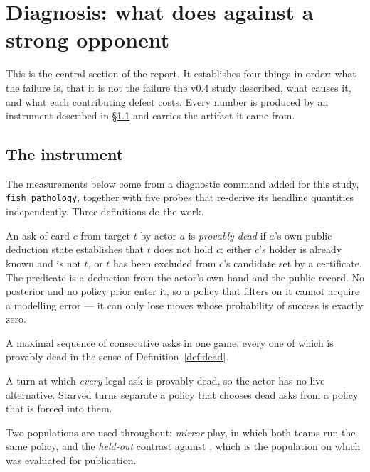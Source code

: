 \section{Diagnosis: what \vfour{} does against a strong opponent}
\label{sec:diagnosis}

This is the central section of the report. It establishes four things in order:
what the failure is, that it is not the failure the v0.4 study described, what
causes it, and what each contributing defect costs. Every number is produced by
an instrument described in \S\ref{sec:diag-instrument} and carries the artifact
it came from.

\subsection{The instrument}
\label{sec:diag-instrument}

The measurements below come from a diagnostic command added for this study,
\texttt{fish pathology}, together with five probes that re-derive its headline
quantities independently. Three definitions do the work.

\begin{definition}
\label{def:dead}
An ask of card $c$ from target $t$ by actor $a$ is \emph{provably dead} if $a$'s
own public deduction state establishes that $t$ does not hold $c$: either $c$'s
holder is already known and is not $t$, or $t$ has been excluded from $c$'s
candidate set by a certificate. The predicate is a deduction from the actor's own
hand and the public record. No posterior and no policy prior enter it, so a
policy that filters on it cannot acquire a modelling error --- it can only lose
moves whose probability of success is exactly zero.
\end{definition}

\begin{definition}
A maximal sequence of consecutive asks in one game, every one of which is
provably dead in the sense of Definition~\ref{def:dead}.
\end{definition}

\begin{definition}
A turn at which \emph{every} legal ask is provably dead, so the actor has no live
alternative. Starved turns separate a policy that chooses dead asks from a policy
that is forced into them.
\end{definition}

Two populations are used throughout: \emph{mirror} play, in which both teams run
the same policy, and the \emph{held-out} contrast against \vthree{}, which is the
population on which \vfour{} was evaluated for publication.

